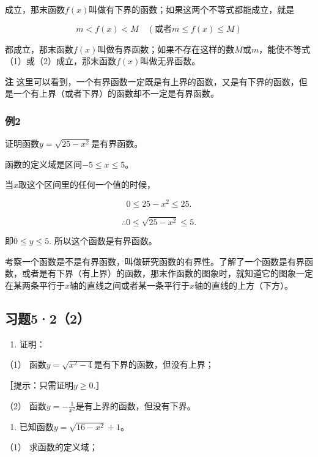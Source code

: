 成立，那末函数\(f(x)\)叫做有下界的函数；如果这两个不等式都能成立，就是

\[
m < f (x) < M \quad (\text{或者} m \leqslant f (x) \leqslant M) \tag {3}
\]

都成立，那末函数\(f(x)\)叫做有界函数；如果不存在这样的数\(M\)或\(m\)，能使不等式（1）或（2）成立，那末函数\(f(x)\)叫做无界函数。

\textbf{注}
这里可以看到，一个有界函数一定既是有上界的函数，又是有下界的函数，但是一个有上界（或者下界）的函数却不一定是有界函数。

\subsubsection{例2}

证明函数\(y = \sqrt{25 - x^2}\)是有界函数。

 函数的定义域是区间\(-5 \leqslant x \leqslant 5\)。

当\(x\)取这个区间里的任何一个值的时候，

\[
0 \leqslant 25 - x^{2} \leqslant 25.
\]

\[
\therefore 0 \leqslant \sqrt{25 - x^{2}} \leqslant 5.
\]

即\(0 \leqslant y \leqslant 5.\) 所以这个函数是有界函数。

考察一个函数是不是有界函数，叫做研究函数的有界性。了解了一个函数是有界函数，或者是有下界（有上界）的函数，那末作函数的图象时，就知道它的图象一定在某两条平行于\(x\)轴的直线之间或者某一条平行于\(x\)轴的直线的上方（下方）。

\subsection{习题5·2（2）}

\begin{enumerate}
\item
  证明：
\end{enumerate}

（1） 函数\(y=\sqrt{x^{2}-4}\)是有下界的函数，但没有上界；

［提示：只需证明\(y \geqslant 0\).］

（2） 函数\(y = -\frac{1}{x^{2}}\)是有上界的函数，但没有下界。

\begin{enumerate}[start=2]
\item
  已知函数\(y = \sqrt{16 - x^2} + 1\)。
\end{enumerate}

（1） 求函数的定义域；

